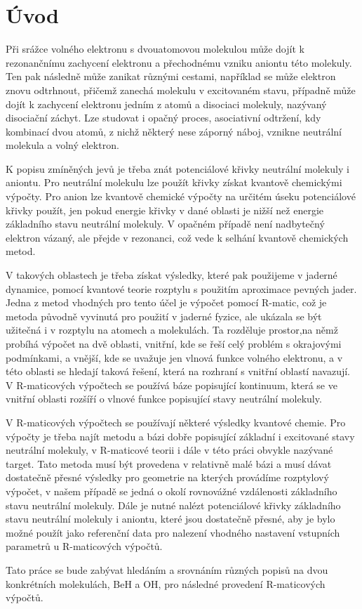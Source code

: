 \chapter*{Úvod}
Při srážce volného elektronu s dvouatomovou molekulou může dojít k rezonančnímu
zachycení elektronu a přechodnému vzniku aniontu této molekuly. Ten pak následně může 
zanikat různými cestami, například se může elektron znovu odtrhnout, přičemž zanechá 
molekulu v excitovaném stavu,
případně může dojít k zachycení elektronu jedním z atomů a disociaci molekuly, nazývaný 
disociační záchyt.
Lze studovat i opačný proces, asociativní odtržení, kdy kombinací dvou atomů, z nichž 
některý nese záporný náboj, vznikne neutrální molekula a volný elektron.

K popisu zmíněných jevů je třeba znát potenciálové křivky neutrální molekuly i aniontu.
Pro neutrální molekulu lze použít křivky získat kvantově chemickými výpočty. Pro anion 
lze kvantově chemické výpočty na určitém úseku potenciálové křivky použít, jen pokud 
energie křivky v dané oblasti je nižší než energie základního stavu neutrální molekuly. 
V opačném případě není nadbytečný elektron vázaný, ale přejde v rezonanci, což vede k 
selhání kvantově chemických metod.

V takových oblastech je třeba získat výsledky, které pak použijeme v jaderné dynamice, 
pomocí kvantové teorie rozptylu s použitím aproximace pevných jader.
Jedna z metod vhodných pro tento účel je výpočet pomocí R-matic, což je metoda původně 
vyvinutá pro použití v jaderné fyzice, ale ukázala se být užitečná i v rozptylu na 
atomech a molekulách.
Ta rozděluje prostor,na němž probíhá výpočet na dvě oblasti, vnitřní, kde se řeší celý 
problém s okrajovými podmínkami, a vnější, kde se uvažuje jen 
vlnová funkce volného elektronu, a v této oblasti se hledají taková řešení, která na 
rozhraní s vnitřní oblastí navazují.
V R-maticových výpočtech se používá báze popisující kontinuum, která se ve vnitřní  
oblasti rozšíří o vlnové funkce popisující stavy neutrální molekuly.

V R-maticových výpočtech se používají některé výsledky kvantové chemie. Pro 
výpočty je třeba najít metodu a bázi dobře popisující základní i excitované stavy 
neutrální molekuly, 
v R-maticové teorii i dále v této práci obvykle nazývané target.
Tato metoda musí být provedena v relativně malé bázi a musí dávat dostatečně přesné 
výsledky pro geometrie na kterých provádíme rozptylový výpočet, v našem případě se 
jedná o okolí rovnovážné vzdálenosti základního stavu neutrální molekuly.
Dále je nutné nalézt potenciálové křivky základního stavu neutrální molekuly i aniontu, 
které jsou dostatečně přesné, aby je bylo možné použít jako referenční data pro 
nalezení vhodného nastavení vstupních parametrů u R-maticových výpočtů.

Tato práce se bude zabývat hledáním a srovnáním 
různých popisů na dvou konkrétních molekulách, BeH a OH,
pro následné provedení R-maticových výpočtů.

